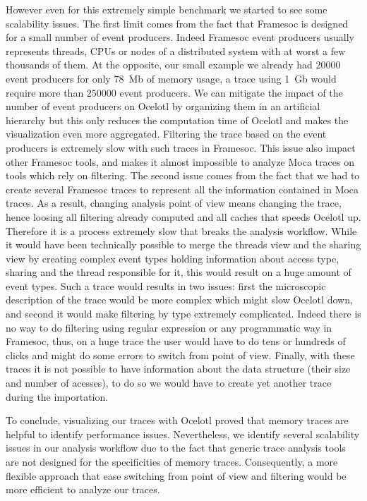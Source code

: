 However even for this extremely simple benchmark we started to see some scalability issues.
The first limit comes from the fact that \gls{Framesoc} is designed for a small number of event producers.
Indeed \gls{Framesoc} event producers usually represents threads, \glspl{CPU} or nodes of a distributed system with at worst a few thousands of them.
At the opposite, our small example we already had $20000$ event producers for only \SI{78}{Mb} of memory usage, a trace using \SI{1}{Gb} would require more than $250000$ event producers.
We can mitigate the impact of the number of event producers on \gls{Ocelotl} by organizing them in an artificial hierarchy but this only reduces the computation time of \gls{Ocelotl} and makes the visualization even more aggregated.
Filtering the trace based on the event producers is extremely slow with such traces in \gls{Framesoc}.
This issue also impact other \gls{Framesoc} tools, and makes it almost impossible to analyze \gls{Moca} traces on tools which rely on filtering.
The second issue comes from the fact that we had to create several \gls{Framesoc} traces to represent all the information contained in \gls{Moca} traces.
As a result, changing analysis point of view means changing the trace, hence loosing all filtering already computed and all caches that speeds \gls{Ocelotl} up.
Therefore it is a process extremely slow that breaks the analysis workflow.
While it would have been technically possible to merge the threads view and the sharing view by creating complex event types holding information about access type, sharing and the thread responsible for it, this would result on a huge amount of event types.
Such a trace would results in two issues: first the microscopic description of the trace would be more complex which might slow \gls{Ocelotl} down, and second it would make filtering by type extremely complicated.
Indeed there is no way to do filtering using regular expression or any programmatic way in \gls{Framesoc}, thus, on a huge trace the user would have to do tens or hundreds of clicks and might do some errors to switch from point of view.
Finally, with these traces it is not possible to have information about the data structure (their size and number of acesses), to do so we would have to create yet another trace during the importation.

To conclude, visualizing our traces with \gls{Ocelotl} proved that memory traces are helpful to identify performance issues.
Nevertheless, we identify several scalability issues in our analysis workflow due to the fact that generic trace analysis tools are not designed for the specificities of memory traces.
Consequently, a more flexible approach that ease switching from point of view and filtering would be more efficient to analyze our traces.

